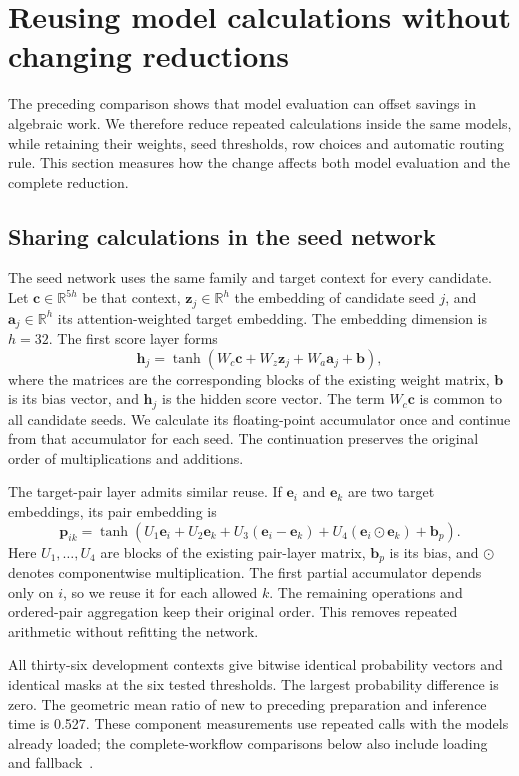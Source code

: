 \clearpage
\section{Reusing model calculations without changing reductions}
\label{sec:shared-evaluation}
The preceding comparison shows that model evaluation can offset savings in
algebraic work. We therefore reduce repeated calculations inside the same
models, while retaining their weights, seed thresholds, row choices and
automatic routing rule. This section measures how the change affects both
model evaluation and the complete reduction.

\subsection{Sharing calculations in the seed network}
The seed network uses the same family and target context for every candidate.
Let $\boldsymbol c\in\mathbb R^{5h}$ be that context,
$\boldsymbol z_j\in\mathbb R^h$ the embedding of candidate seed $j$, and
$\boldsymbol a_j\in\mathbb R^h$ its attention-weighted target embedding.
The embedding dimension is $h=32$. The first score layer forms
\[
 \boldsymbol h_j=\tanh\!\left(
 W_c\boldsymbol c+W_z\boldsymbol z_j+W_a\boldsymbol a_j+\boldsymbol b
 \right),
\]
where the matrices are the corresponding blocks of the existing weight matrix,
$\boldsymbol b$ is its bias vector, and $\boldsymbol h_j$ is the hidden score
vector. The term $W_c\boldsymbol c$ is common to all candidate seeds.
We calculate its floating-point accumulator once and continue from that
accumulator for each seed. The continuation preserves the original order
of multiplications and additions.

The target-pair layer admits similar reuse. If $\boldsymbol e_i$ and
$\boldsymbol e_k$ are two target embeddings, its pair embedding is
\[
 \boldsymbol p_{ik}=\tanh\!\left(
 U_1\boldsymbol e_i+U_2\boldsymbol e_k+
 U_3(\boldsymbol e_i-\boldsymbol e_k)+
 U_4(\boldsymbol e_i\odot\boldsymbol e_k)+\boldsymbol b_p
 \right).
\]
Here $U_1,\ldots,U_4$ are blocks of the existing pair-layer matrix,
$\boldsymbol b_p$ is its bias, and $\odot$ denotes componentwise multiplication.
The first partial accumulator depends only on $i$, so we reuse it for each
allowed $k$. The remaining operations and ordered-pair aggregation keep their
original order. This removes repeated arithmetic without refitting the network.

All thirty-six development contexts give bitwise identical probability vectors
and identical masks at the six tested thresholds. The largest probability
difference is zero. The geometric mean ratio of new to preceding preparation
and inference time is 0.527. These component measurements use repeated calls with the models already
loaded; the complete-workflow comparisons below also include loading and
fallback~\cite{KiraSharedEvaluationData}.

